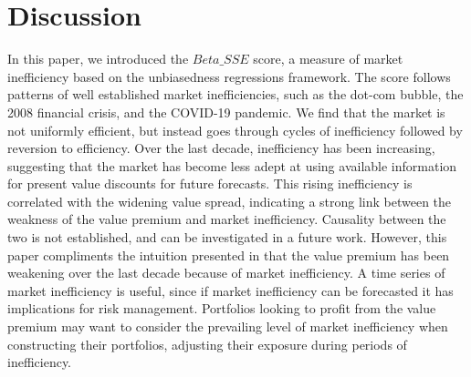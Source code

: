 \section{Discussion}
\label{sec:conclusion}

In this paper, we introduced the $Beta\_SSE$ score, a measure of market inefficiency based on the unbiasedness regressions framework. The score follows patterns 
of well established market inefficiencies, such as the dot-com bubble, the 2008 financial crisis, and the COVID-19 pandemic.
We find that the market is not uniformly efficient, but instead goes through cycles of inefficiency followed by reversion to efficiency.
Over the last decade, inefficiency has been increasing, suggesting that the market has become less adept at using available information for present value discounts for future forecasts.
This rising inefficiency is correlated with the widening value spread, indicating a strong link between the weakness of the value premium and market inefficiency.
Causality between the two is not established, and can be investigated in a future work. However, this paper compliments the intuition 
presented in \citet{asness_2024} that the value premium has been weakening over the last decade because of market inefficiency.
A time series of market inefficiency is useful, since if market inefficiency can be forecasted it has implications for risk management.
Portfolios looking to profit from the value premium may want to consider the prevailing level of market inefficiency when constructing their portfolios,
adjusting their exposure during periods of inefficiency.